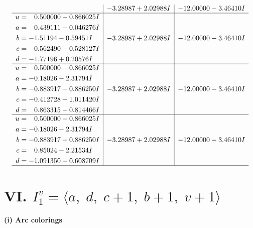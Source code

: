 \documentclass[1p]{elsarticle_modified}
\theoremstyle{definition}
\begin{document}
$$\begin{array}{c|c|c}
 & -3.28987 + 2.02988 I & -12.00000 - 3.46410 I \\ \hline\begin{aligned}
u &= \phantom{-}0.500000 - 0.866025 I \\
a &= \phantom{-}0.439111 - 0.046276 I \\
b &= -1.51194 - 0.59451 I \\
c &= \phantom{-}0.562490 - 0.528127 I \\
d &= -1.77196 + 0.20576 I\end{aligned}
 & -3.28987 + 2.02988 I & -12.00000 - 3.46410 I \\ \hline\begin{aligned}
u &= \phantom{-}0.500000 - 0.866025 I \\
a &= -0.18026 - 2.31794 I \\
b &= -0.883917 + 0.886250 I \\
c &= -0.412728 + 1.011420 I \\
d &= \phantom{-}0.863315 - 0.814466 I\end{aligned}
 & -3.28987 + 2.02988 I & -12.00000 - 3.46410 I \\ \hline\begin{aligned}
u &= \phantom{-}0.500000 - 0.866025 I \\
a &= -0.18026 - 2.31794 I \\
b &= -0.883917 + 0.886250 I \\
c &= \phantom{-}0.85024 - 2.21534 I \\
d &= -1.091350 + 0.608709 I\end{aligned}
 & -3.28987 + 2.02988 I & -12.00000 - 3.46410 I\\
 \hline 
 \end{array}$$\newpage\newpage\renewcommand{\arraystretch}{1}
\centering \section*{VI. $I^v_{1}= \langle a,\;d,\;c+1,\;b+1,\;v+1 \rangle$}
\flushleft \textbf{(i) Arc colorings}\\
\end{document}
